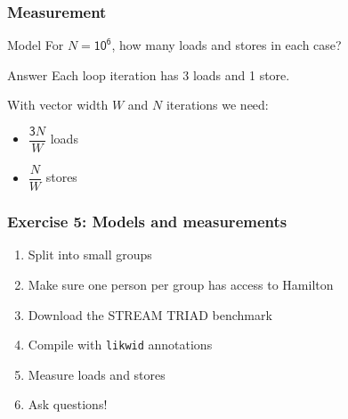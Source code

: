 \documentclass[dvipsnames,presentation,aspectratio=169,14pt]{beamer}
\begin{document}
\begin{frame}
  \frametitle{Measurement}
  \begin{challenge}{Model}
    For $N = \mathsf{10^6}$, how many loads and stores in each case?
  \end{challenge}
  \pause
  \begin{answer}{Answer}
    Each loop iteration has 3 loads and 1 store.

    With vector width $W$ and $N$ iterations we need:
    \vskip 4pt
    \begin{itemize}[itemsep=4pt]
    \item $\dfrac{\mathsf 3N}{W}$ loads
    \item $\dfrac{N}{W}$ stores
    \end{itemize}

  \end{answer}
\end{frame}

\begin{frame}
  \frametitle{Exercise 5: Models and measurements}
  \begin{enumerate}[itemsep=8pt]
  \item Split into small groups
  \item Make sure one person per group has access to Hamilton
  \item Download the STREAM TRIAD benchmark
  \item Compile with \verb#likwid# annotations
  \item Measure loads and stores
  \item Ask questions!
  \end{enumerate}
\end{frame}
\end{document}
